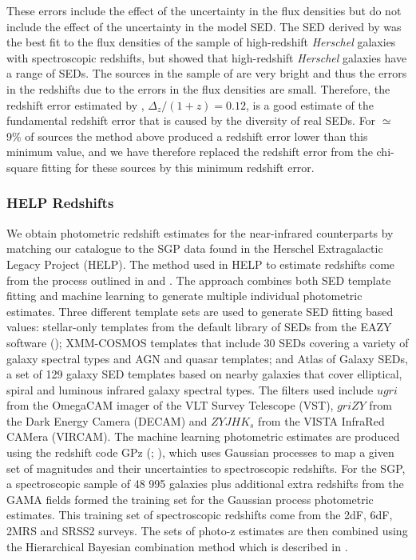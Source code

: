 \documentclass[fleqn,usenatbib]{mnras}
\begin{document}
These errors include the effect of the uncertainty in the flux densities but do not include the effect of the uncertainty in the model SED. The SED derived by \citealt{Pearson_2013} was the best fit to the flux densities of the sample of high-redshift \textit{Herschel} galaxies with spectroscopic redshifts, but \citealt{Bakx_2018} showed that high-redshift \textit{Herschel} galaxies have a range of SEDs. The sources in the sample of \citealt{Pearson_2013} are very bright and thus the errors in the redshifts due to the errors in the flux densities are small. Therefore, the redshift error estimated by \citealt{Pearson_2013}, $\Delta_z/(1+z) = 0.12$, is a good estimate of the fundamental redshift error that is caused by the diversity of real SEDs. For $\simeq$9\% of sources the method above produced a redshift error lower than this minimum value, and we have therefore replaced the redshift error from the chi-square fitting for these sources by this minimum redshift error.

\subsubsection{HELP Redshifts}
\label{sec:help_redshifts}

We obtain photometric redshift estimates for the near-infrared counterparts by matching our catalogue to the SGP data found in the Herschel Extragalactic Legacy Project (HELP). The method used in HELP to estimate redshifts come from the process outlined in \citealt{Duncan_2018a} and \citealt{Duncan_2018b}. The approach combines both SED template fitting and machine learning to generate multiple individual photometric estimates. Three different template sets are used to generate SED fitting based values: stellar-only templates from the default library of SEDs from the EAZY software (\citealt{Brammer_2008}); \citealt{Salvato_2009} XMM-COSMOS templates that include 30 SEDs covering a variety of galaxy spectral types and AGN and quasar templates; and \citealt{Brown_2014} Atlas of Galaxy SEDs, a set of 129 galaxy SED templates based on nearby galaxies that cover elliptical, spiral and luminous infrared galaxy spectral types. The filters used include $ugri$ from the OmegaCAM imager of the VLT Survey Telescope (VST), $griZY$ from the Dark Energy Camera (DECAM) and $ZYJHK_s$ from the VISTA InfraRed CAMera (VIRCAM). The machine learning photometric estimates are produced using the redshift code GPz (\citealt{Almosallam_2016a}; \citealt{Almosallam_2016b}), which uses Gaussian processes to map a given set of magnitudes and their uncertainties to spectroscopic redshifts. For the SGP, a spectroscopic sample of 48 995 galaxies plus additional extra redshifts from the GAMA fields formed the training set for the Gaussian process photometric estimates. This training set of spectroscopic redshifts come from the 2dF, 6dF, 2MRS and SRSS2 surveys. The sets of photo-z estimates are then combined using the Hierarchical Bayesian combination method which is described in \citealt{Dahlen_2013}.
\end{document}
